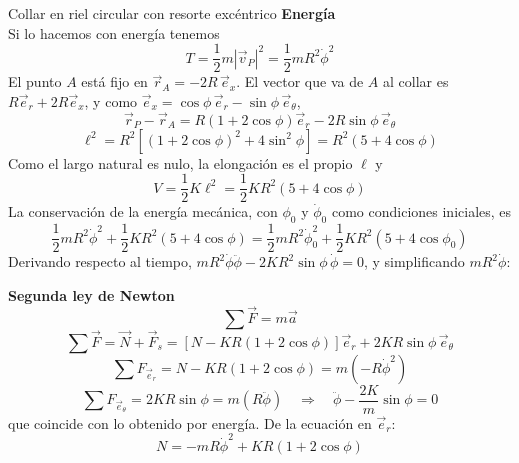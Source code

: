 \begin{solucion}{Collar en riel circular con resorte excéntrico}
\textbf{Energía}\\
Si lo hacemos con energía tenemos
$$T=\frac{1}{2}m\left|\vec{v}_P\right|^2=\frac{1}{2}mR^2\dot\phi^2$$
El punto $A$ está fijo en $\vec{r}_A=-2R\,\vec{e}_x$. El vector que va de $A$ al collar es $R\vec{e}_r+2R\vec{e}_x$, y como $\vec{e}_x=\cos\phi\,\vec{e}_r-\sin\phi\,\vec{e}_\theta$,
$$\vec{r}_P-\vec{r}_A=R\left(1+2\cos\phi\right)\vec{e}_r-2R\sin\phi\,\vec{e}_\theta$$
$$\ell^2=R^2\left[\left(1+2\cos\phi\right)^2+4\sin^2\phi\right]=R^2\left(5+4\cos\phi\right)$$
Como el largo natural es nulo, la elongación es el propio $\ell$ y
$$V=\frac{1}{2}K\ell^2=\frac{1}{2}KR^2\left(5+4\cos\phi\right)$$
La conservación de la energía mecánica, con $\phi_0$ y $\dot\phi_0$ como condiciones iniciales, es
$$\frac{1}{2}mR^2\dot\phi^2+\frac{1}{2}KR^2\left(5+4\cos\phi\right)=\frac{1}{2}mR^2\dot\phi_0^2+\frac{1}{2}KR^2\left(5+4\cos\phi_0\right)$$
Derivando respecto al tiempo, $mR^2\dot\phi\ddot\phi-2KR^2\sin\phi\,\dot\phi=0$, y simplificando $mR^2\dot\phi$:

\textbf{Segunda ley de Newton}
$$\sum \vec{F} = m \vec{a}$$
$$\sum \vec{F} = \vec{N} + \vec{F}_s = \left[ N - KR(1 + 2\cos\phi) \right] \vec{e}_r + 2KR \sin\phi \, \vec{e}_\theta$$
$$\sum F_{\vec{e}_r} = N - KR(1 + 2\cos\phi) = m(-R\dot{\phi}^2)$$
$$\sum F_{\vec{e}_\theta} = 2KR \sin\phi = m(R\ddot{\phi})\quad\Longrightarrow\quad\ddot{\phi} - \frac{2K}{m} \sin\phi = 0$$
que coincide con lo obtenido por energía. De la ecuación en $\vec{e}_r$:
$$N = -mR\dot{\phi}^2 + KR(1 + 2\cos\phi)$$


\end{solucion}

